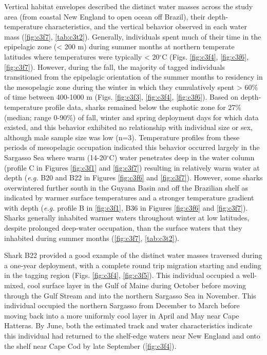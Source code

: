 Vertical habitat envelopes described the distinct water masses across the study area (from coastal New England to open ocean off Brazil), their depth-temperature characteristics, and the vertical behavior observed in each water mass (\cref{fig:c3f7}, \cref{tab:c3t2}). Generally, individuals spent much of their time in the epipelagic zone (< 200 m) during summer months at northern temperate latitudes where temperatures were typically < 20$^{\circ}$C (Figs. \ref{fig:c3f4}, \ref{fig:c3f6}, \ref{fig:c3f7}). However, during the fall, the majority of tagged individuals transitioned from the epipelagic orientation of the summer months to residency in the mesopelagic zone during the winter in which they cumulatively spent > 60\% of time between 400-1000 m (Figs. \ref{fig:c3f3}, \ref{fig:c3f4}, \ref{fig:c3f6}). Based on depth-temperature profile data, sharks remained below the euphotic zone for 27\% (median; range 0-90\%) of fall, winter and spring deployment days for which data existed, and this behavior exhibited no relationship with individual size or sex, although male sample size was low (n=3). Temperature profiles from these periods of mesopelagic occupation indicated this behavior occurred largely in the Sargasso Sea where warm (14-20$^{\circ}$C) water penetrates deep in the water column (profile C in Figures \ref{fig:c3f1} and \ref{fig:c3f7}) resulting in relatively warm water at depth (\emph{e.g.} B20 and B22 in Figures \ref{fig:c3f6} and \ref{fig:c3f7}). However, some sharks overwintered further south in the Guyana Basin and off the Brazilian shelf as indicated by warmer surface temperatures and a stronger temperature gradient with depth (\emph{e.g.} profile B in \cref{fig:c3f1}, B36 in Figures \ref{fig:c3f6} and \ref{fig:c3f7}). Sharks generally inhabited warmer waters throughout winter at low latitudes, despite prolonged deep-water occupation, than the surface waters that they inhabited during summer months (\cref{fig:c3f7}, \cref{tab:c3t2}).

Shark B22 provided a good example of the distinct water masses traversed during a one-year deployment, with a complete round trip migration starting and ending in the tagging region (Figs. \ref{fig:c3f4}, \ref{fig:c3f5}). This individual occupied a well-mixed, cool surface layer in the Gulf of Maine during October before moving through the Gulf Stream and into the northern Sargasso Sea in November. This individual occupied the northern Sargasso from December to March before moving back into a more uniformly cool layer in April and May near Cape Hatteras. By June, both the estimated track and water characteristics indicate this individual had returned to the shelf-edge waters near New England and onto the shelf near Cape Cod by late September (\cref{fig:c3f4}).

